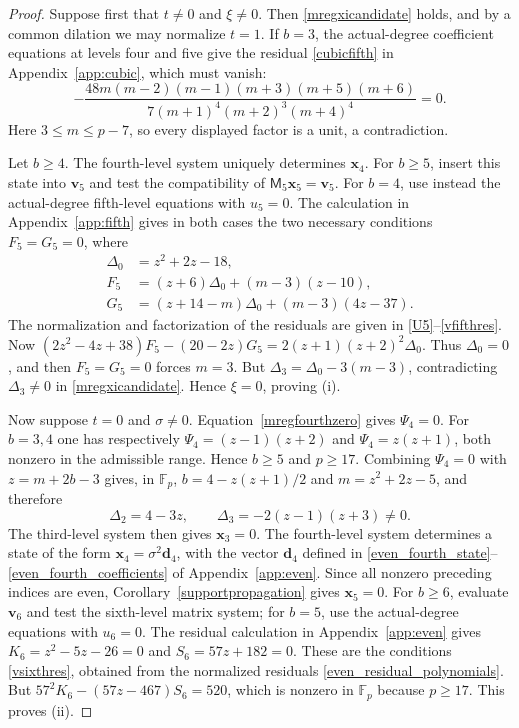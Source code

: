 \documentclass[10pt,a4paper]{amsart}
\newcommand{\F}{\mathbb{F}_p}
\begin{document}
\begin{proof}
Suppose first that $t\ne0$ and $\xi\ne0$.  Then
\eqref{mregxicandidate} holds, and by a common dilation we may normalize
$t=1$.  If $b=3$, the actual-degree coefficient equations at levels
four and five give the residual \eqref{cubicfifth} in
Appendix~\ref{app:cubic}, which must vanish:
\[
 -\frac{48m(m-2)(m-1)(m+3)(m+5)(m+6)}
 {7(m+1)^4(m+2)^3(m+4)^4}=0.
\]
Here $3\le m\le p-7$, so every displayed factor is a unit, a
contradiction.

Let $b\ge4$.  The fourth-level system uniquely determines
$\mathbf x_4$.  For $b\ge5$, insert this state into $\mathbf v_5$ and
test the compatibility of $\mathsf M_5\mathbf x_5=\mathbf v_5$.
For $b=4$, use instead the actual-degree fifth-level equations with
$u_5=0$.  The calculation in Appendix~\ref{app:fifth} gives in both cases the two
necessary conditions $F_5=G_5=0$, where
\[
\begin{aligned}
 \Delta_0&=z^2+2z-18,\\
 F_5&=(z+6)\Delta_0+(m-3)(z-10),\\
 G_5&=(z+14-m)\Delta_0+(m-3)(4z-37).
\end{aligned}
\]
The normalization and factorization of the residuals are given in
\eqref{U5}--\eqref{vfifthres}.  Now
$(2z^2-4z+38)F_5-(20-2z)G_5=2(z+1)(z+2)^2\Delta_0$.
Thus $\Delta_0=0$, and then $F_5=G_5=0$ forces $m=3$.  But
$\Delta_3=\Delta_0-3(m-3)$, contradicting $\Delta_3\ne0$ in \eqref{mregxicandidate}.  Hence
$\xi=0$, proving \textup{(i)}.

Now suppose $t=0$ and $\sigma\ne0$.  Equation~\eqref{mregfourthzero}
gives $\Psi_4=0$.  For $b=3,4$ one has respectively
$\Psi_4=(z-1)(z+2)$ and $\Psi_4=z(z+1)$, both nonzero in the admissible
range.  Hence $b\ge5$ and $p\ge17$.  Combining $\Psi_4=0$ with
$z=m+2b-3$ gives, in $\F$, $b=4-z(z+1)/2$ and
$m=z^2+2z-5$, and therefore
\[
 \Delta_2=4-3z,
 \qquad
 \Delta_3=-2(z-1)(z+3)\ne0.
\]
The third-level system then gives $\mathbf x_3=0$.  The fourth-level
system determines a state of the form
$\mathbf x_4=\sigma^2\mathbf d_4$, with the vector $\mathbf d_4$ defined in
\eqref{even_fourth_state}--\eqref{even_fourth_coefficients} of
Appendix~\ref{app:even}.  Since all nonzero preceding indices are even,
Corollary~\ref{supportpropagation} gives $\mathbf x_5=0$.
For $b\ge6$, evaluate $\mathbf v_6$ and test the sixth-level matrix
system; for $b=5$, use the actual-degree equations with $u_6=0$.
The residual calculation in Appendix~\ref{app:even} gives
$K_6=z^2-5z-26=0$ and $S_6=57z+182=0$.  These are the conditions \eqref{vsixthres}, obtained from the normalized
residuals \eqref{even_residual_polynomials}.  But
$57^2K_6-(57z-467)S_6=520$, which is nonzero in $\F$ because $p\ge17$.  This proves \textup{(ii)}.


\end{proof}
\end{document}
